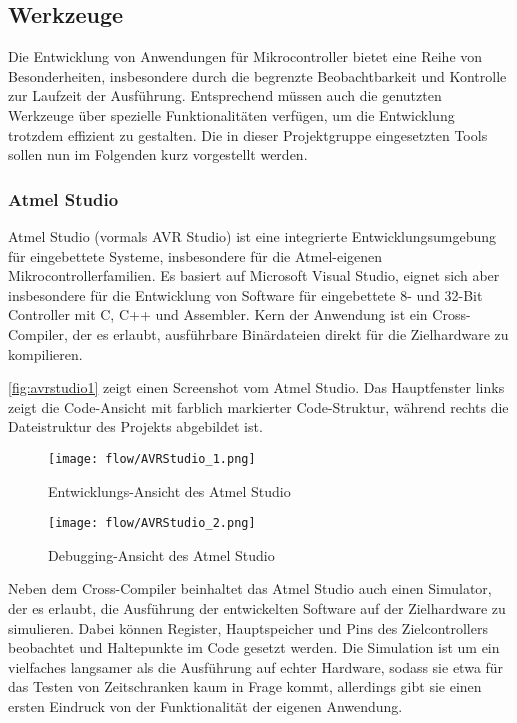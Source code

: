 \subsection{Werkzeuge}
Die Entwicklung von Anwendungen für Mikrocontroller bietet eine Reihe von Besonderheiten, insbesondere durch die begrenzte Beobachtbarkeit und Kontrolle zur Laufzeit der Ausführung. Entsprechend müssen auch die genutzten Werkzeuge über spezielle Funktionalitäten verfügen, um die Entwicklung trotzdem effizient zu gestalten. Die in dieser Projektgruppe eingesetzten Tools sollen nun im Folgenden kurz vorgestellt werden.

\subsubsection{Atmel Studio}
Atmel Studio (vormals AVR Studio) ist eine integrierte Entwicklungsumgebung für eingebettete Systeme, insbesondere für die Atmel-eigenen Mikrocontrollerfamilien.
Es basiert auf Microsoft Visual Studio, eignet sich aber insbesondere für die Entwicklung von Software für eingebettete 8- und 32-Bit Controller mit C, C++ und Assembler.
Kern der Anwendung ist ein Cross-Compiler, der es erlaubt, ausführbare Binärdateien direkt für die Zielhardware zu kompilieren.

\autoref{fig:avrstudio1} zeigt einen Screenshot vom Atmel Studio. Das Hauptfenster links zeigt die Code-Ansicht mit farblich markierter Code-Struktur, während rechts die Dateistruktur des Projekts abgebildet ist.

\begin{figure}[!t]
  \centering
    \texttt{[image: flow/AVRStudio\_1.png]}
    \caption{Entwicklungs-Ansicht des Atmel Studio}
    \label{fig:avrstudio1}
\end{figure}

\begin{figure}[!h]
  \centering
    \texttt{[image: flow/AVRStudio\_2.png]}
    \caption{Debugging-Ansicht des Atmel Studio}
    \label{fig:avrstudio2}
\end{figure}

Neben dem Cross-Compiler beinhaltet das Atmel Studio auch einen Simulator, der es erlaubt, die Ausführung der entwickelten Software auf der Zielhardware zu simulieren. Dabei können Register, Hauptspeicher und Pins des Zielcontrollers beobachtet und Haltepunkte im Code gesetzt werden. Die Simulation ist um ein vielfaches langsamer als die Ausführung auf echter Hardware, sodass sie etwa für das Testen von Zeitschranken kaum in Frage kommt, allerdings gibt sie einen ersten Eindruck von der Funktionalität der eigenen Anwendung.

